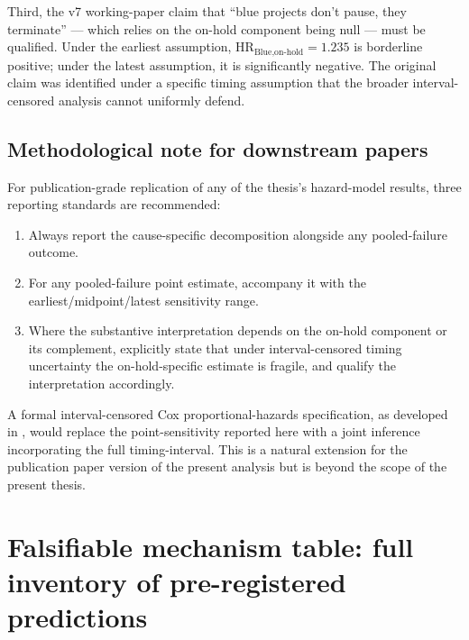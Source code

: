 Third, the v7 working-paper claim that ``blue projects don't pause, they terminate'' --- which relies on the on-hold component being null --- must be qualified. Under the earliest assumption, $\text{HR}_{\text{Blue,on-hold}} = 1.235$ is borderline positive; under the latest assumption, it is significantly negative. The original claim was identified under a specific timing assumption that the broader interval-censored analysis cannot uniformly defend.

\subsection*{Methodological note for downstream papers}

For publication-grade replication of any of the thesis's hazard-model results, three reporting standards are recommended:
\begin{enumerate}
\item Always report the cause-specific decomposition alongside any pooled-failure outcome.
\item For any pooled-failure point estimate, accompany it with the earliest/midpoint/latest sensitivity range.
\item Where the substantive interpretation depends on the on-hold component or its complement, explicitly state that under interval-censored timing uncertainty the on-hold-specific estimate is fragile, and qualify the interpretation accordingly.
\end{enumerate}

A formal interval-censored Cox proportional-hazards specification, as developed in \cite{sun2006statistical}, would replace the point-sensitivity reported here with a joint inference incorporating the full timing-interval. This is a natural extension for the publication paper version of the present analysis but is beyond the scope of the present thesis.


\section{Falsifiable mechanism table: full inventory of pre-registered predictions}
\label{app:mechanism_table}


